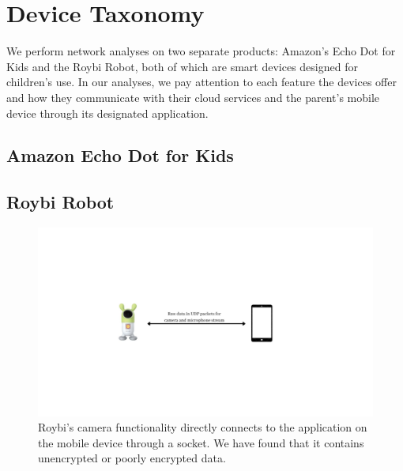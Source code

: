 \documentclass[12pt]{ucthesis}
\begin{document}
\chapter{Device Taxonomy}
\label{ch:taxonomy}
We perform network analyses on two separate products: Amazon's Echo Dot for Kids and the Roybi Robot, both of which are smart devices designed for children's use. In our analyses, we pay attention to each feature the devices offer and how they communicate with their cloud services and the parent's mobile device through its designated application.

\section{Amazon Echo Dot for Kids}


\section{Roybi Robot}
\begin{figure}
    \includegraphics[width=\textwidth]{udp.jpg}
    \caption{Roybi's camera functionality directly connects to the application on the mobile device through a socket. We have found that it contains unencrypted or poorly encrypted data.}
    \label{fig:udp}
\end{figure}
\end{document}

